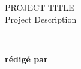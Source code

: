 \begin{titlepage}

	\begin{center}

		

		\textsc{\LARGE PROJECT TITLE }\\[0.5cm]
		{\Large Project Description}\\ [1cm]

		\HRule%
		\vspace{0.4cm}

		{\huge \bfseries \articletitle}\\[0.4cm]
		
		\HRule%
		\vspace{1.5cm}

	\vfill
	\end{center}
	
	
	
	\begin{flushright} \Large
		\textbf{rédigé par}%
		\\
		\auteur%
	\end{flushright}



	\begin{center}
		{\large{\customdate}}
	\end{center}
\end{titlepage}
